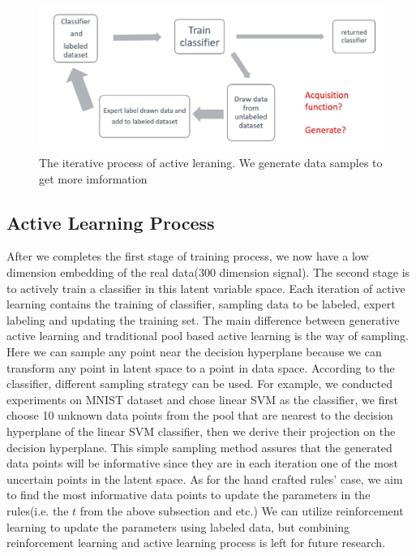\documentclass[10pt,twocolumn,letterpaper]{article}
\begin{document}
\begin{figure}[t]
    \begin{center}
       \includegraphics[width=0.8\linewidth]{active.jpg}
    \end{center}
       \caption{The iterative process of active leraning. We generate data samples to get more imformation}
    \end{figure}

\subsection{Active Learning Process}
After we completes the first stage of training process, we now have a low dimension embedding of the real data(300 dimension signal). The second stage is to actively train a classifier in this latent variable space. Each iteration of active learning contains the training of classifier, sampling data to be labeled, expert labeling and updating the training set. The main difference between generative active learning and traditional pool based active learning is the way of sampling. Here we can sample any point near the decision hyperplane because we can transform any point in latent space to a point in data space. According to the classifier, different sampling strategy can be used. For example, we conducted experiments on MNIST dataset and chose linear SVM as the classifier, we first choose 10 unknown data points from the pool that are nearest to the decision hyperplane of the linear SVM classifier, then we derive their projection on the decision hyperplane. This simple sampling method assures that the generated data points will be informative since they are in each iteration one of the most uncertain points in the latent space. As for the hand crafted rules' case, we aim to find the most informative data points to update the parameters in the rules(i.e. the $t$ from the above subsection and etc.) We can utilize reinforcement learning to update the parameters using labeled data, but combining reinforcement learning and active learning process is left for future research.
\end{document}

